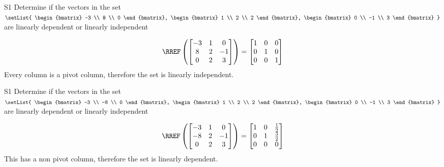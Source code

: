 \begin{problem}{S1}
Determine if the vectors in the set \(\setList{ \begin{bmatrix} -3 \\ 8 \\ 0 \end{bmatrix}, \begin{bmatrix} 1 \\ 2 \\ 2 \end{bmatrix}, \begin{bmatrix} 0 \\ -1 \\ 3 \end{bmatrix} }\) are  linearly dependent or linearly independent
\end{problem}
\begin{solution}
\[\RREF\left( \begin{bmatrix}-3 & 1 & 0 \\ 8 & 2 & -1 \\ 0 & 2 & 3 \end{bmatrix}\right) = \begin{bmatrix} 1 & 0 & 0 \\ 0 & 1 & 0 \\ 0 & 0 & 1 \end{bmatrix}\]
Every column is a pivot column, therefore the set is linearly independent.
\end{solution}

\begin{problem}{S1}
Determine if the vectors in the set \(\setList{ \begin{bmatrix} -3 \\ -8 \\ 0 \end{bmatrix}, \begin{bmatrix} 1 \\ 2 \\ 2 \end{bmatrix}, \begin{bmatrix} 0 \\ -1 \\ 3 \end{bmatrix} }\) are  linearly dependent or linearly independent
\end{problem}
\begin{solution}
\[\RREF\left( \begin{bmatrix}-3 & 1 & 0 \\ -8 & 2 & -1 \\ 0 & 2 & 3 \end{bmatrix}\right) = \begin{bmatrix} 1 & 0 & \frac{1}{2} \\ 0 & 1 & \frac{3}{2} \\ 0 & 0 & 0 \end{bmatrix}\]
This has a non pivot column, therefore the set is linearly dependent.
\end{solution}



